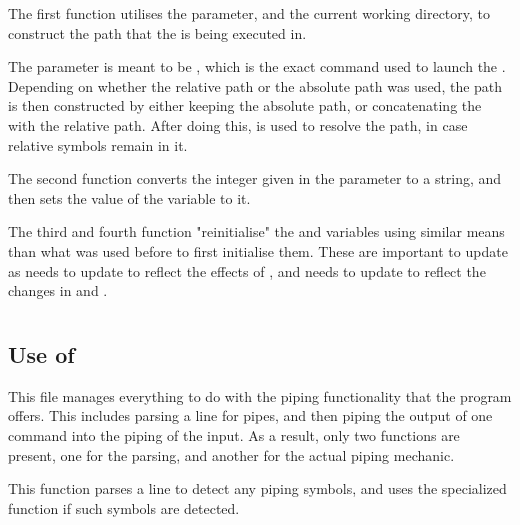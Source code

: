 \documentclass[12pt, a4paper]{report}
\begin{document}
                The first function utilises the parameter, and the current working directory,
                to construct the path that the  is being executed in.

                The parameter is meant to be , which is the exact command used to
                launch the . Depending on whether the relative path 
                 or the absolute path  was used,
                the path is then constructed by either keeping the absolute path, or 
                concatenating the  with the relative path. After doing this,
                 is used to resolve the path, in case relative symbols 
                remain in it.

                The second function converts the integer given in the parameter to a string,
                and then sets the value of the  variable to it.

                The third and fourth function "reinitialise" the  and 
                variables using similar means than what was used before to first initialise 
                them. These are important to update as  needs to update to reflect
                the effects of , and  needs to update to reflect the
                changes in  and .
                \clearpage

        \section{}
            \subsection{Use of }
                This file manages everything to do with the piping 
                functionality that the program offers. This includes
                parsing a line for pipes, and then piping the output
                of one command into the piping of the input. 
                As a result, only two functions are present, one for
                the parsing, and another for the actual piping mechanic.

                This function parses a line to detect any piping symbols,
                and uses the specialized  function
                if such symbols are detected.
\end{document}

